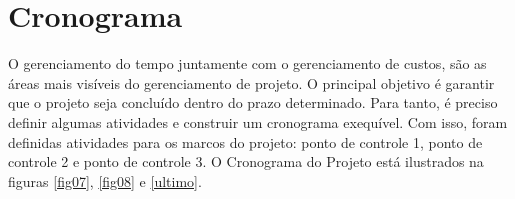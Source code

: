 \section[Cronograma]{Cronograma}

O gerenciamento do tempo juntamente com o gerenciamento de custos, são as áreas mais visíveis do gerenciamento de projeto. O principal objetivo é garantir que o projeto seja concluído dentro do prazo determinado. Para tanto, é preciso definir algumas atividades e construir um cronograma exequível. Com isso, foram definidas atividades para os marcos do projeto: ponto de controle 1, ponto de controle 2 e ponto de controle 3. O Cronograma do Projeto está ilustrados na figuras \ref{fig07}, \ref{fig08} e \ref{ultimo}.





